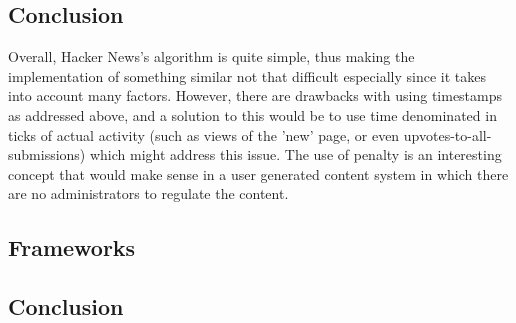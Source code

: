 \subsection {Conclusion}
Overall, Hacker News's algorithm is quite simple, thus making the implementation of something similar not that difficult especially since it takes into account many factors. However, there are drawbacks with using timestamps as addressed above, and a solution to this would be to use time denominated in ticks of actual activity (such as views of the 'new' page, or even upvotes-to-all-submissions) which might address this issue.
The use of penalty is an interesting concept that would make sense in a user generated content system in which there are no administrators to regulate the content.

\subsection{Frameworks}

\subsection{Conclusion}

